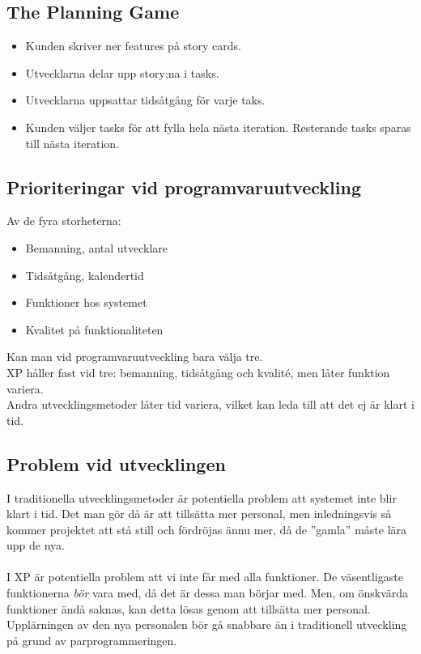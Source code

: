 \documentclass[a4paper]{article}
\begin{document}
\subsection{The Planning Game}
\begin{itemize}
\item{Kunden skriver ner features på story cards.}
\item{Utvecklarna delar upp story:na i tasks.}
\item{Utvecklarna uppsattar tidsåtgång för varje taks.}
\item{Kunden väljer tasks för att fylla hela nästa iteration. Resterande tasks sparas till nästa iteration.}
\end{itemize}
\subsection{Prioriteringar vid programvaruutveckling}
Av de fyra storheterna:
\begin{itemize}
\item{Bemanning, antal utvecklare}
\item{Tidsåtgång, kalendertid}
\item{Funktioner hos systemet}
\item{Kvalitet på funktionaliteten}
\end{itemize}
Kan man vid programvaruutveckling bara välja tre. \\
XP håller fast vid tre: bemanning, tidsåtgång och kvalité, men låter funktion variera. \\ 
Andra utvecklingsmetoder låter tid variera, vilket kan leda till att det ej är klart i tid. 

\subsection{Problem vid utvecklingen}
I traditionella utvecklingsmetoder är potentiella problem att systemet inte blir klart i tid. Det man gör då är att tillsätta mer personal, men inledningsvis så kommer projektet att stå still och fördröjas ännu mer, då de ''gamla'' måste lära upp de nya. \\ \\
I XP är potentiella problem att vi inte får med alla funktioner. De väsentligaste funktionerna \emph{bör} vara med, då det är dessa man börjar med. Men, om önskvärda funktioner ändå saknas, kan detta lösas genom att tillsätta mer personal. Upplärningen av den nya personalen bör gå snabbare än i traditionell utveckling på grund av parprogrammeringen. 
\end{document}
